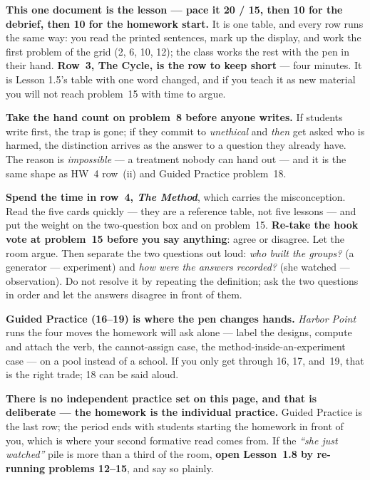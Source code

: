 \documentclass[10pt]{article}
\begin{document}
\begin{teachernote}
\textbf{This one document is the lesson --- pace it 20 / 15, then 10 for the debrief, then 10 for
the homework start.} It is one table, and every row runs the same way: you read the printed
sentences, mark up the display, and work the first problem of the grid (2, 6, 10, 12); the class
works the rest with the pen in their hand. \textbf{Row~3, The Cycle, is the row to keep short} ---
four minutes. It is Lesson 1.5's table with one word changed, and if you teach it as new
material you will not reach problem~15 with time to argue.

\textbf{Take the hand count on problem~8 before anyone writes.} If students write first, the trap
is gone; if they commit to \emph{unethical} and \emph{then} get asked who is harmed, the
distinction arrives as the answer to a question they already have. The reason is
\emph{impossible} --- a treatment nobody can hand out --- and it is the same shape as HW~4
row~(ii) and Guided Practice problem~18.

\textbf{Spend the time in row~4, \emph{The Method}}, which carries the misconception. Read the
five cards quickly --- they are a reference table, not five lessons --- and put the weight on the
two-question box and on problem~15. \textbf{Re-take the hook vote at problem~15 before you say
anything}: agree or disagree. Let the room argue. Then separate the two questions out loud:
\emph{who built the groups?} (a generator --- experiment) and \emph{how were the answers
recorded?} (she watched --- observation). Do not resolve it by repeating the definition; ask the
two questions in order and let the answers disagree in front of them.

\textbf{Guided Practice (16--19) is where the pen changes hands.} \emph{Harbor Point} runs the
four moves the homework will ask alone --- label the designs, compute and attach the verb, the
cannot-assign case, the method-inside-an-experiment case --- on a pool instead of a school. If
you only get through 16, 17, and~19, that is the right trade; 18 can be said aloud.

\textbf{There is no independent practice set on this page, and that is deliberate --- the
homework is the individual practice.} Guided Practice is the last row; the period ends with
students starting the homework in front of you, which is where your second formative read comes
from. If the \emph{``she just watched''} pile is more than a third of the room, \textbf{open
Lesson~1.8 by re-running problems 12--15}, and say so plainly.
\end{teachernote}
\end{document}
